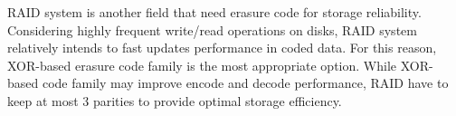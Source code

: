 \documentclass[a4paper, 12pt]{article}
\begin{document}
RAID system is another field that need erasure code for storage
reliability. Considering highly frequent write/read operations on
disks, RAID system relatively intends to fast updates performance in
coded data. For this reason, XOR-based erasure code family is the most
appropriate option. While XOR-based code family may improve encode and
decode performance, RAID have to keep at most 3 parities to provide
optimal storage efficiency.





\end{document}

